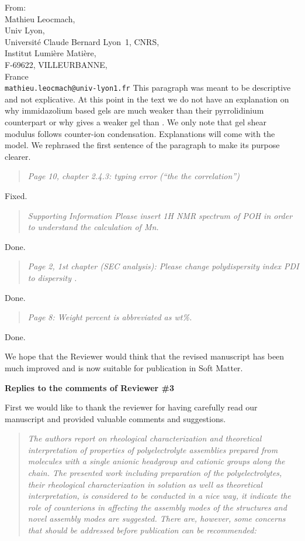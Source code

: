 \documentclass[a4paper, parskip=true, firsthead=false, fromemail=true, foldmarks=false]{scrlttr2}
\newenvironment{quotationi}
{\begin{quotation}\itshape}
{\end{quotation}}
\newcommand{\journal}{Soft Matter}
\begin{document}
\begin{letter}{From:\\
Mathieu Leocmach,\\
Univ Lyon,\\ 
Universit\'e Claude Bernard Lyon~1, CNRS,\\
Institut Lumi\`ere Mati\`ere,\\
F-69622, VILLEURBANNE,\\
France\\
\texttt{mathieu.leocmach@univ-lyon1.fr}
}
This paragraph was meant to be descriptive and not explicative. At this point in the text we do not have an explanation on why immidazolium based gels are much weaker than their pyrrolidinium counterpart or why  gives a weaker gel than . We only note that gel shear modulus follows counter-ion condensation. Explanations will come with the model. We rephrased the first sentence of the paragraph to make its purpose clearer.

\begin{quotationi}
Page 10, chapter 2.4.3: typing error (“the the correlation”)
\end{quotationi}

Fixed.

\begin{quotationi}
Supporting Information
Please insert 1H NMR spectrum of POH in order to understand the calculation of Mn.
\end{quotationi}

Done.

\begin{quotationi}
Page 2, 1st chapter (SEC analysis): Please change polydispersity index PDI to dispersity \DJ.
\end{quotationi}

Done.

\begin{quotationi}
Page 8: Weight percent is abbreviated as wt\%.
\end{quotationi}

Done.



We hope that the Reviewer would think that the revised manuscript has been much improved and is now suitable for publication in \journal. 
 
\clearpage

\textsf{\textbf{Replies to the comments of Reviewer \#3}}

First we would like to thank the reviewer for having carefully read our manuscript and provided valuable comments and suggestions.

\begin{quotationi}
The authors report on rheological characterization and theoretical interpretation of properties of polyelectrolyte assemblies prepared from molecules with a single anionic headgroup and cationic groups along the chain. The presented work including preparation of the polyelectrolytes, their rheological characterization in solution as well as theoretical interpretation, is considered to be conducted in a nice way, it indicate the role of counterions in affecting the assembly modes of the structures and novel assembly modes are suggested. There are, however, some concerns that should be addressed before publication can be recommended:


\end{quotationi}
\end{letter}
\end{document}
